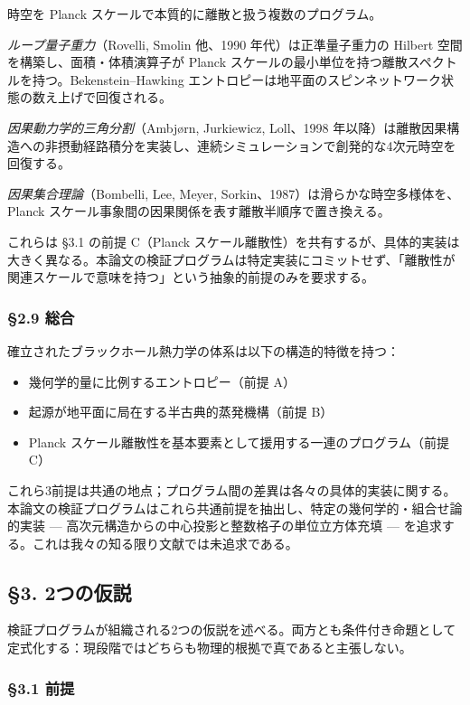 \documentclass[a4paper,11pt]{ltjsarticle}
\theoremstyle{definition}
\providecommand{\tightlist}{\setlength{\itemsep}{0pt}\setlength{\parskip}{0pt}}
\begin{document}
時空を Planck スケールで本質的に離散と扱う複数のプログラム。

\emph{ループ量子重力}（Rovelli, Smolin 他、1990 年代）は正準量子重力の
Hilbert 空間を構築し、面積・体積演算子が Planck
スケールの最小単位を持つ離散スペクトルを持つ。Bekenstein--Hawking
エントロピーは地平面のスピンネットワーク状態の数え上げで回復される。

\emph{因果動力学的三角分割}（Ambjørn, Jurkiewicz, Loll、1998
年以降）は離散因果構造への非摂動経路積分を実装し、連続シミュレーションで創発的な4次元時空を回復する。

\emph{因果集合理論}（Bombelli, Lee, Meyer,
Sorkin、1987）は滑らかな時空多様体を、Planck
スケール事象間の因果関係を表す離散半順序で置き換える。

これらは §3.1 の前提 C（Planck
スケール離散性）を共有するが、具体的実装は大きく異なる。本論文の検証プログラムは特定実装にコミットせず、「離散性が関連スケールで意味を持つ」という抽象的前提のみを要求する。

\subsubsection{§2.9 総合}\label{ux7dcfux5408}

確立されたブラックホール熱力学の体系は以下の構造的特徴を持つ：

\begin{itemize}
\tightlist
\item
  幾何学的量に比例するエントロピー（前提 A）
\item
  起源が地平面に局在する半古典的蒸発機構（前提 B）
\item
  Planck スケール離散性を基本要素として援用する一連のプログラム（前提
  C）
\end{itemize}

これら3前提は共通の地点；プログラム間の差異は各々の具体的実装に関する。本論文の検証プログラムはこれら共通前提を抽出し、特定の幾何学的・組合せ論的実装
--- 高次元構造からの中心投影と整数格子の単位立方体充填 ---
を追求する。これは我々の知る限り文献では未追求である。

\subsection{§3. 2つの仮説}\label{ux3064ux306eux4eeeux8aac}

検証プログラムが組織される2つの仮説を述べる。両方とも条件付き命題として定式化する：現段階ではどちらも物理的根拠で真であると主張しない。

\subsubsection{§3.1 前提}\label{ux524dux63d0}
\end{document}
